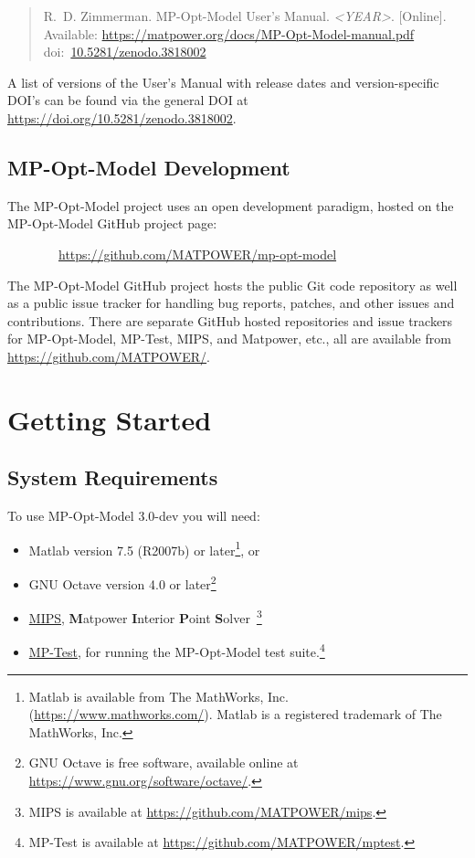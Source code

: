 \documentclass[12pt]{article}
\newcommand{\matlab}[0]{{\sc Matlab}}
\newcommand{\matpower}[0]{{\sc Matpower}}
\newcommand{\mptest}[0]{{MP-Test}}
\newcommand{\mptesturl}[0]{https://github.com/MATPOWER/mptest}
\newcommand{\mptestlink}[0]{\href{\mptesturl}{\mptest{}}}
\newcommand{\mips}[0]{{MIPS}}
\newcommand{\mipsurl}[0]{https://github.com/MATPOWER/mips}
\newcommand{\mipslink}[0]{\href{\mipsurl}{\mips{}}}
\newcommand{\mipsname}[0]{{{\bf M}{\sc atpower} \textbf{I}nterior \textbf{P}oint \textbf{S}olver}}
\newcommand{\mpom}[0]{\mbox{MP-Opt-Model}}
\newcommand{\mpomurl}[0]{https://github.com/MATPOWER/mp-opt-model}
\newcommand{\mpomname}[0]{\mpom{}}
\newcommand{\mpomver}[0]{3.0-dev}
\newcommand{\doi}[1]{doi:~\href{https://doi.org/#1}{#1}}
\numberwithin{equation}{section}
\numberwithin{table}{section}
\numberwithin{figure}{section}
\begin{document}
\begin{quote}
\footnotesize
R.~D. Zimmerman. \mpomname{} User's Manual. \emph{\textless{}YEAR\textgreater{}}.
[Online]. Available: \url{https://matpower.org/docs/MP-Opt-Model-manual.pdf}\\
\doi{10.5281/zenodo.3818002}
\end{quote}
A list of versions of the User's Manual with release dates and
version-specific DOI's can be found via the general DOI at
\url{https://doi.org/10.5281/zenodo.3818002}.

\subsection{\mpom{} Development}
\label{sec:development}

The \mpom{} project uses an open development paradigm, hosted on the \mpom{} GitHub project page:

\bigskip

~~~~~~~~\url{\mpomurl}

\bigskip

The \mpom{} GitHub project hosts the public Git code repository as well as a public issue tracker for handling bug reports, patches, and other issues and contributions. There are separate GitHub hosted repositories and issue trackers for \mpom{}, \mptest{}, \mips{}, and \matpower{}, etc., all are available from \url{https://github.com/MATPOWER/}.


\clearpage
\section{Getting Started}


\subsection{System Requirements}
\label{sec:sysreq}
To use \mpom{} \mpomver{} you will need:
\begin{itemize}
\item \matlab{}\textsuperscript{\tiny \textregistered} version 7.5 (R2007b) or later\footnote{\matlab{} is available from The MathWorks, Inc. (\url{https://www.mathworks.com/}). \matlab{} is a registered trademark of The MathWorks, Inc.}, or
\item GNU Octave version 4.0 or later\footnote{GNU Octave \cite{octave} is free software, available online at \url{https://www.gnu.org/software/octave/}.}
\item \mipslink{}, \mipsname{}~\cite{wang2007a, mips_manual}\footnote{\mips{} is available at \url{\mipsurl}.}
\item \mptestlink{}, for running the \mpom{} test suite.\footnote{\mptest{} is available at \url{\mptesturl}.}
\end{itemize}
\end{document}
